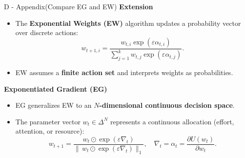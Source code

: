 \documentclass{beamer}
\begin{document}
\begin{frame}{D - Appendix(Compare EG and EW)}
\textbf{Extension}
    \begin{itemize}
        \item The \textbf{Exponential Weights (EW)} algorithm updates 
              a probability vector over discrete actions:
              \[
              w_{t+1,i} 
              = 
              \frac{
                  w_{t,i} \exp(\varepsilon \alpha_{t,i})
              }{
                  \sum_{j=1}^{k} w_{t,j} \exp(\varepsilon \alpha_{t,j})
              }.
              \]
        \item EW assumes a \textbf{finite action set} and interprets weights as probabilities.
    \end{itemize}
\textbf{Exponentiated Gradient (EG)}
    \begin{itemize}
        \item EG generalizes EW to an \textbf{$N$-dimensional continuous decision space}.
        \item The parameter vector $w_t \in \Delta^N$ represents 
              a continuous allocation (effort, attention, or resource):
              \[
              w_{t+1}
              = 
              \frac{
                  w_t \odot \exp(\varepsilon \nabla_t)
              }{
                  \|\,w_t \odot \exp(\varepsilon \nabla_t)\|_1
              },
              \quad
              \nabla_t = \alpha_t = \frac{\partial U(w_t)}{\partial w_t}.
              \]
    \end{itemize}
\end{frame}
\end{document}
